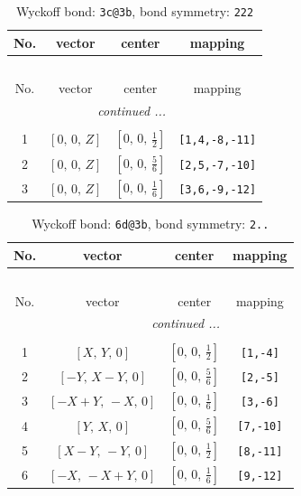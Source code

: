 \documentclass[fleqn,8pt]{jsarticle}
\begin{document}
\renewcommand{\arraystretch}{1.2}
\begin{longtable}{cccc}
\caption{Wyckoff bond: {\tt 3c@3b}, bond symmetry: {\tt 222}}
 \\
 \hline \hline
No. & vector & center & mapping \\ \hline \endfirsthead

\multicolumn{3}{l}{\tablename\ \thetable{}} \\
 \hline \hline
No. & vector & center & mapping \\ \hline \endhead

 \hline \hline
\multicolumn{3}{r}{\footnotesize\it continued ...} \\ \endfoot

 \hline \hline
\multicolumn{3}{r}{} \\ \endlastfoot

1 & $\left[ 0,\, 0,\, Z \right]$ & $\left[ 0,\, 0,\, \frac{1}{2} \right]$ & {\tt [1,4,-8,-11]} \\ \hline
2 & $\left[ 0,\, 0,\, Z \right]$ & $\left[ 0,\, 0,\, \frac{5}{6} \right]$ & {\tt [2,5,-7,-10]} \\ \hline
3 & $\left[ 0,\, 0,\, Z \right]$ & $\left[ 0,\, 0,\, \frac{1}{6} \right]$ & {\tt [3,6,-9,-12]} \\
\end{longtable}
\renewcommand{\arraystretch}{1.2}
\begin{longtable}{cccc}
\caption{Wyckoff bond: {\tt 6d@3b}, bond symmetry: {\tt 2..}}
 \\
 \hline \hline
No. & vector & center & mapping \\ \hline \endfirsthead

\multicolumn{3}{l}{\tablename\ \thetable{}} \\
 \hline \hline
No. & vector & center & mapping \\ \hline \endhead

 \hline \hline
\multicolumn{3}{r}{\footnotesize\it continued ...} \\ \endfoot

 \hline \hline
\multicolumn{3}{r}{} \\ \endlastfoot

1 & $\left[ X,\, Y,\, 0 \right]$ & $\left[ 0,\, 0,\, \frac{1}{2} \right]$ & {\tt [1,-4]} \\ \hline
2 & $\left[ - Y,\, X - Y,\, 0 \right]$ & $\left[ 0,\, 0,\, \frac{5}{6} \right]$ & {\tt [2,-5]} \\ \hline
3 & $\left[ - X + Y,\, - X,\, 0 \right]$ & $\left[ 0,\, 0,\, \frac{1}{6} \right]$ & {\tt [3,-6]} \\ \hline
4 & $\left[ Y,\, X,\, 0 \right]$ & $\left[ 0,\, 0,\, \frac{5}{6} \right]$ & {\tt [7,-10]} \\ \hline
5 & $\left[ X - Y,\, - Y,\, 0 \right]$ & $\left[ 0,\, 0,\, \frac{1}{2} \right]$ & {\tt [8,-11]} \\ \hline
6 & $\left[ - X,\, - X + Y,\, 0 \right]$ & $\left[ 0,\, 0,\, \frac{1}{6} \right]$ & {\tt [9,-12]} \\
\end{longtable}
\end{document}
